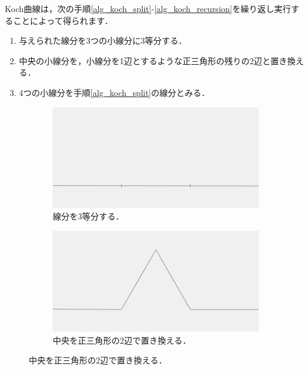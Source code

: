 \documentclass[dvipdfmx]{jsarticle}
\theoremstyle{definition}
\newcommand{\enumproc}{\setlength{\leftskip}{2em}}
\begin{document}
Koch曲線は，次の手順\ref{alg_koch_split}-\ref{alg_koch_recursion}を繰り返し実行することによって得られます．
\begin{enumerate}
    \enumproc
    \item 与えられた線分を3つの小線分に3等分する．
        \label{alg_koch_split}
    \item 中央の小線分を，小線分を1辺とするような正三角形の残りの2辺と置き換える．
        \label{alg_koch_replace}
    \item 4つの小線分を手順\ref{alg_koch_split}の線分とみる．
        \label{alg_koch_recursion}
\end{enumerate}
%
\begin{figure}[H]
    \centering
    \begin{subfigure}{0.325\textwidth}
        \centering
        \includegraphics[width=\textwidth]{figure/koch/koch_curve0_split.png}
        \caption{線分を3等分する．}
        \label{fig_proc_kochcurve0_split}
    \end{subfigure}
    \begin{subfigure}{0.325\textwidth}
        \centering
        \includegraphics[width=\textwidth]{figure/koch/koch_curve1.png}
        \caption{中央を正三角形の2辺で置き換える．}
        \label{fig_proc_kochcurve1}
    \end{subfigure}

\end{figure}
\end{document}

